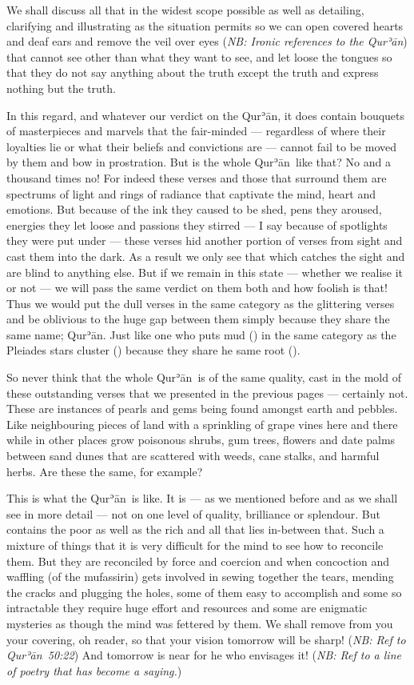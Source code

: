 \documentclass[12pt]{memoir}
\def\´{ʾ} %
\newcommand{\ar}[1]{\RL{\arabicfont#1}}
\def \Quran{Qur\-\´ān} %
\newcommand{\QRef}[1]{{\color{darkblue}#1}}
\newcommand{\NB}[1]{\emph{\small NB: #1}}
\begin{document}
We shall discuss all that in the widest scope possible as well as detailing,
clarifying and illustrating as the situation permits so we can open
covered hearts and deaf ears and remove the veil over eyes
(\NB{Ironic references to the \Quran})
that cannot see other than what they want to see, and let loose the tongues
so that they do not say anything about the truth
except the truth and express nothing but the truth.

In this regard, and whatever our verdict on the \Quran,
it does contain bouquets of masterpieces and marvels that the fair-minded —
regardless of where their loyalties lie or
what their beliefs and convictions are —
cannot fail to be moved by them and bow in prostration.
But is the whole \Quran\ like that?
No and a thousand times no!
For indeed these verses and those that surround them
are spectrums of light and rings of radiance
that captivate the mind, heart and emotions.
But because of the ink they caused to be shed, pens they aroused,
energies they let loose and passions they stirred —
I say because of spotlights they were put under —
these verses hid another portion of verses from sight
and cast them into the dark.
As a result we only see that which catches the sight
and are blind to anything else.
But if we remain in this state — whether we realise it or not —
we will pass the same verdict on them both and how foolish is that!
Thus we would put the dull verses in the same category as the glittering verses
and be oblivious to the huge gap between them
simply because they share the same name; \Quran.
Just like one who puts mud (\ar{الثرى}) in the same category
as the Pleiades stars cluster (\ar{الثريا})
because they share he same root (\ar{ث ر ي}).

So never think that the whole \Quran\ is of the same quality,
cast in the mold of these outstanding verses
that we presented in the previous pages — certainly not.
These are instances of pearls and gems being found amongst earth and pebbles.
Like neighbouring pieces of land with a sprinkling of grape vines here
and there while in other places grow poisonous shrubs, gum trees,
flowers and date palms between sand dunes that are scattered
with weeds, cane stalks, and harmful herbs.
Are these the same, for example?

This is what the \Quran\ is like.
It is — as we mentioned before and as we shall see in more detail —
not on one level of quality, brilliance or splendour.
But contains the poor as well as the rich and all that lies in-between that.
Such a mixture of things that it is very difficult
for the mind to see how to reconcile them.
But they are reconciled by force and coercion
and when concoction and waffling (of the mufassirin)
gets involved in sewing together the tears,
mending the cracks and plugging the holes,
some of them easy to accomplish and some so intractable
they require huge effort and resources and some are enigmatic mysteries
as though the mind was fettered by them.
We shall remove from you your covering, oh reader,
so that your vision tomorrow will be sharp!
(\NB{Ref to \Quran\ \QRef{50:22}})
And tomorrow is near for he who envisages it!
(\NB{Ref to a line of poetry that has become a saying.})
\end{document}
